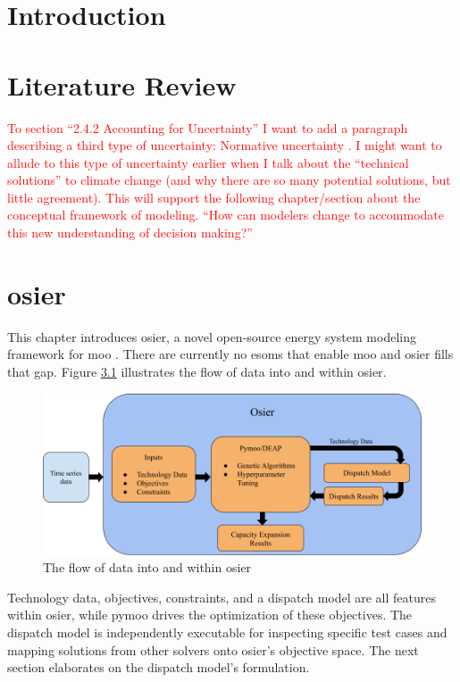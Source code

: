 \chapter{Introduction}
\chapter{Literature Review}
\label{chapter:lit-review}

\textcolor{red}{To section ``2.4.2 Accounting for Uncertainty'' I want to add 
a paragraph describing a third type of uncertainty: Normative uncertainty 
\cite{taebi_governing_2020}. I might want to allude to this type of uncertainty
earlier when I talk about the ``technical solutions'' to climate change (and why
there are so many potential solutions, but little agreement). This will support
the following chapter/section about the conceptual framework of modeling. ``How
can modelers change to accommodate this new understanding of decision making?''}


% 


\chapter{\acf{osier}}
\label{chapter:osier}

This chapter introduces \acf{osier}, a novel open-source energy system modeling
framework for \acl{moo} \cite{dotson_osier_nodate}. There are currently no
\acp{esom} that enable \ac{moo} and \ac{osier} fills that gap. Figure 
\ref{fig:osier_flow} illustrates the flow of data into and within \ac{osier}.

\begin{figure}[H]
    \centering
    \includegraphics[width=\columnwidth]{figures/osier_flow}
    \caption{The flow of data into and within \ac{osier}}
    \label{fig:osier_flow}
\end{figure}

Technology data, objectives, constraints, and a dispatch model are all features
within \ac{osier}, while \ac{pymoo} drives the optimization of these objectives.
The dispatch model is independently executable for inspecting specific test
cases and mapping solutions from other solvers onto \ac{osier}'s objective
space. The next section elaborates on the dispatch model's formulation.

